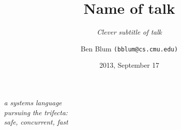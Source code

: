\documentclass[xcolor=dvipsnames]{beamer}
\title[Rust]{{\bf Name of talk}}
\subtitle[]{ {\em Clever subtitle of talk}}
\author[Ben Blum]{Ben Blum \texttt{(bblum@cs.cmu.edu)}}
\institute[Mozilla Research]{Mozilla Research}
\date[]{2013, September 17}
\begin{document}
\normalem
\begin{frame}
	\titlepage
\end{frame}


\newcommand\linegap{\vspace{0.2in}}
\newcommand\breakslide[1]{\begin{frame}{} \begin{center} \Large #1 \end{center} \end{frame}}
\newcommand\related[1]{\textsuperscript{\em [#1]}}
\newcommand\hilight[2]{\color{#1}#2\color{black}}

\begin{frame}{}
	\begin{center}
		{\em a systems language} \\
		{\em pursuing the trifecta:} \\
		{\em safe, concurrent, fast}
	\end{center}
\end{frame}
\end{document}
